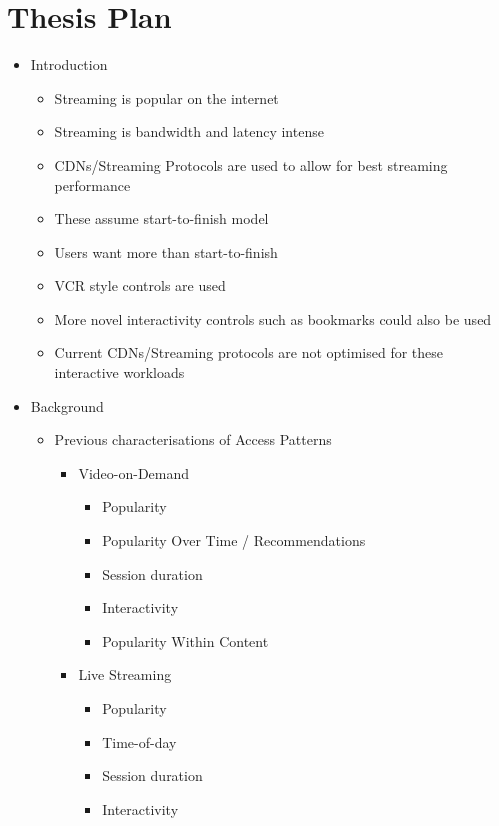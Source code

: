 \singlespacing

\chapter{Thesis Plan}
\label{chap:plan}

\begin{itemize}
    \item Introduction
    \begin{itemize}
        \item Streaming is popular on the internet
        \item Streaming is bandwidth and latency intense
        \item CDNs/Streaming Protocols are used to allow for best streaming performance
        \item These assume start-to-finish model

        \item Users want more than start-to-finish
        \item VCR style controls are used
        \item More novel interactivity controls such as bookmarks could also be used
        \item Current CDNs/Streaming protocols are not optimised for these interactive workloads
    \end{itemize}

    \item Background

    \begin{itemize}%
        \item Previous characterisations of Access Patterns
        \begin{itemize}
            \item Video-on-Demand
            \begin{itemize}
                \item Popularity
                \item Popularity Over Time / Recommendations
                \item Session duration
                \item Interactivity
                \item Popularity Within Content
            \end{itemize}
            \item Live Streaming
            \begin{itemize}
    				\item Popularity
    				\item Time-of-day
    				\item Session duration
    				\item Interactivity
            \end{itemize}
        \end{itemize}


\end{itemize}
\end{itemize}
